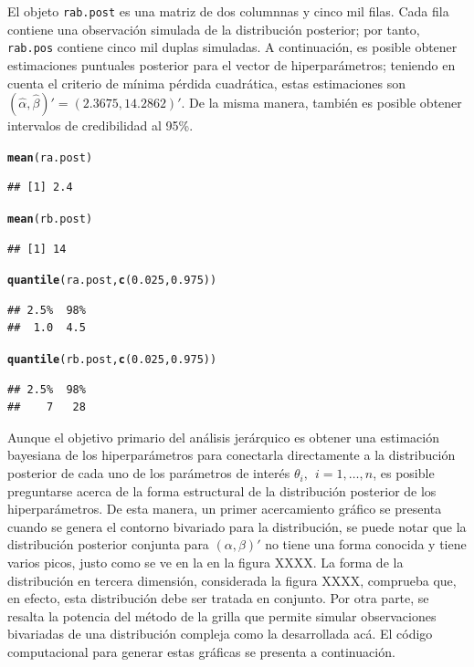 \documentclass[10pt,openright]{book}\usepackage[]{graphicx}\usepackage[]{color}
\makeatletter
\newcommand{\hlnum}[1]{\textcolor[rgb]{0.686,0.059,0.569}{#1}}%
\newcommand{\hlstd}[1]{\textcolor[rgb]{0.345,0.345,0.345}{#1}}%
\newcommand{\hlkwd}[1]{\textcolor[rgb]{0.737,0.353,0.396}{\textbf{#1}}}%
\newenvironment{kframe}{%
 \def\at@end@of@kframe{}%
 \ifinner\ifhmode%
  \def\at@end@of@kframe{\end{minipage}}%
  \begin{minipage}{\columnwidth}%
 \fi\fi%
 \def\FrameCommand##1{\hskip\@totalleftmargin \hskip-\fboxsep
 \colorbox{shadecolor}{##1}\hskip-\fboxsep
     \hskip-\linewidth \hskip-\@totalleftmargin \hskip\columnwidth}%
 \MakeFramed {\advance\hsize-\width
   \@totalleftmargin\z@ \linewidth\hsize
   \@setminipage}}%
 {\par\unskip\endMakeFramed%
 \at@end@of@kframe}
\newenvironment{knitrout}{}{} %
\makeatother
\begin{document}
El objeto \verb'rab.post' es una matriz de dos columnnas y cinco mil filas. Cada fila contiene una observaci\'on simulada de la distribuci\'on posterior; por tanto, \verb'rab.pos' contiene cinco mil duplas simuladas. A continuaci\'on, es posible obtener estimaciones puntuales posterior para el vector de hiperpar\'ametros; teniendo en cuenta el criterio de m\'inima p\'erdida cuadr\'atica, estas estimaciones son $(\hat{\alpha},\hat{\beta})'=(2.3675, 14.2862)'$. De la misma manera, tambi\'en es posible obtener intervalos de credibilidad al 95\%.

\begin{knitrout}
\color{fgcolor}\begin{kframe}
\begin{alltt}
 \hlkwd{mean}\hlstd{(ra.post)}
\end{alltt}
\begin{verbatim}
## [1] 2.4
\end{verbatim}
\begin{alltt}
 \hlkwd{mean}\hlstd{(rb.post)}
\end{alltt}
\begin{verbatim}
## [1] 14
\end{verbatim}
\begin{alltt}
 \hlkwd{quantile}\hlstd{(ra.post,}\hlkwd{c}\hlstd{(}\hlnum{0.025}\hlstd{,}\hlnum{0.975}\hlstd{))}
\end{alltt}
\begin{verbatim}
## 2.5%  98% 
##  1.0  4.5
\end{verbatim}
\begin{alltt}
 \hlkwd{quantile}\hlstd{(rb.post,}\hlkwd{c}\hlstd{(}\hlnum{0.025}\hlstd{,}\hlnum{0.975}\hlstd{))}
\end{alltt}
\begin{verbatim}
## 2.5%  98% 
##    7   28
\end{verbatim}
\end{kframe}
\end{knitrout}
Aunque el objetivo primario del an\'alisis jer\'arquico es obtener una estimaci\'on bayesiana de los hiperpar\'ametros para conectarla directamente a la distribuci\'on posterior de cada uno de los par\'ametros de inter\'es $\theta_i, \ \ i=1, \ldots, n$, es posible preguntarse acerca de la forma estructural de la distribuci\'on posterior de los hiperpar\'ametros. De esta manera, un primer acercamiento gr\'afico se presenta cuando se genera el contorno bivariado para la distribuci\'on, se puede notar que la distribuci\'on posterior conjunta para $(\alpha, \beta)'$ no tiene una forma conocida y tiene varios picos, justo como se ve en la en la figura XXXX. La forma de la distribuci\'on en tercera dimensi\'on, considerada la figura XXXX, comprueba que, en efecto, esta distribuci\'on debe ser tratada en conjunto. Por otra parte, se resalta la potencia del m\'etodo de la grilla que permite simular observaciones bivariadas de una distribuci\'on compleja como la desarrollada ac\'a. El c\'odigo computacional para generar estas gr\'aficas se presenta a continuaci\'on.
\end{document}

